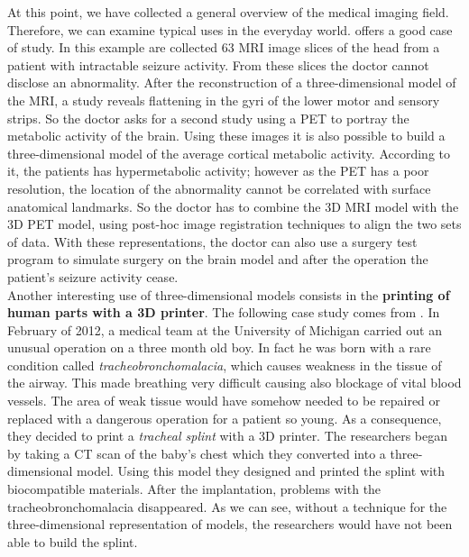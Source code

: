 At this point, we have collected a general overview of the medical imaging field. Therefore, we can examine typical uses in the everyday world. \cite{Stytz} offers a good case of study. In this example are collected 63 MRI image slices of the head from a patient with intractable seizure activity. From these slices the doctor cannot disclose an abnormality. After the reconstruction of a three-dimensional model of the MRI, a study reveals flattening in the gyri of the lower motor and sensory strips. So the doctor asks for a second study using a PET to portray the metabolic activity of the brain. Using these images it is also possible to build a three-dimensional model of the average cortical metabolic activity. According to it, the patients has hypermetabolic activity; however as the PET has a poor resolution, the location of the abnormality cannot be correlated with surface anatomical landmarks. So the doctor has to combine the 3D MRI model with the 3D PET model, using post-hoc image registration techniques to align the two sets of data. With these representations, the doctor can also use a surgery test program to simulate surgery on the brain model and after the operation the patient's seizure activity cease.\\

Another interesting use of three-dimensional models consists in the \textbf{printing of human parts with a 3D printer}.
The following case study comes from \cite{Zopf}. In February of 2012, a medical team at the University of Michigan carried out an unusual operation on a three month old boy. In fact he was born with a rare condition called \textit{tracheobronchomalacia}, which causes weakness in the tissue of the airway. This made breathing very difficult causing also blockage of vital blood vessels. The area of weak tissue would have somehow needed to be repaired or replaced with a dangerous operation for a patient so young. As a consequence, they decided to print a \textit{tracheal splint} with a 3D printer. The researchers began by taking a CT scan of the baby's chest which they converted into a three-dimensional model. Using this model they designed and printed the splint with biocompatible materials. After the implantation, problems with the tracheobronchomalacia disappeared.
As we can see, without a technique for the three-dimensional representation of models, the researchers would have not been able to build the splint.

